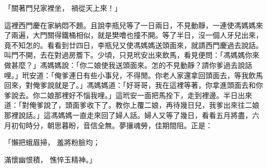 \begin{showcontents}{}
「關著門兒家裡坐，  禍從天上來！」

這裡西門慶在家納悶不題。且說李瓶兒等了一日兩日，不見動靜，一連使馮媽媽來了兩遍，大門關得鐵桶相似，就是樊噲也撞不開。等了半日，沒一個人牙兒出來，竟不知怎的。看看到廿四日，李瓶兒又使馮媽媽送頭面來，就請西門慶過去說話。叫門不開，去在對過房簷下。少頃，只見玳安出來飲馬，看見便問：「馮媽媽你來做甚麼？」馮媽媽說：「你二娘使我送頭面來。怎的不見動靜？請你爹過去說話哩。」玳安道：「俺爹連日有些小事兒，不得閒。你老人家還拿回頭面去，等我飲馬回來，對俺爹說就是了。」馮媽媽道：「好哥哥，我在這裡等著，你拿進頭面去和你爹說去。你二娘那裡好不惱我哩。」這玳安一面把馬拴下，走到裡邊。半日出來道：「對俺爹說了，頭面爹收下了。教你上覆二娘，再待幾日兒，我爹出來往二娘那裡說話。」這馮媽媽一直走來回了婦人話。婦人又等了幾日，看看五月將盡，六月初旬時分，朝思暮盼，音信全無。夢攘魂勞，佳期間阻。正是：

「懶把蛾眉掃，  羞將粉臉均；

滿懷幽恨積，  憔悴玉精神。」


\end{showcontents}
